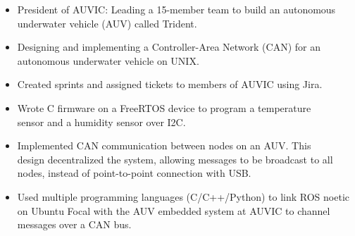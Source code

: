 \documentclass[10pt,a4paper,ragged2e,withhyper]{altacv}
\begin{document}
\begin{paracol}{2}

\begin{itemize}
\item President of AUVIC: Leading a 15-member team to build an autonomous underwater vehicle (AUV) called Trident.
\item Designing and implementing a Controller-Area Network (CAN) for an autonomous underwater vehicle on UNIX.
\item Created sprints and assigned tickets to members of AUVIC using Jira.
\end{itemize}


\begin{itemize}
    \item Wrote C firmware on a FreeRTOS device to program a temperature \\sensor and a humidity sensor over I2C.
    \item Implemented CAN communication between nodes on an AUV. This \\design decentralized the system, allowing messages to be broadcast to all nodes, instead of point-to-point connection with USB.
    \item Used multiple programming languages (C/C++/Python) to link ROS noetic on Ubuntu Focal with the AUV embedded system at AUVIC to channel messages over a CAN bus. 
\end{itemize}




\end{paracol}
\end{document}
